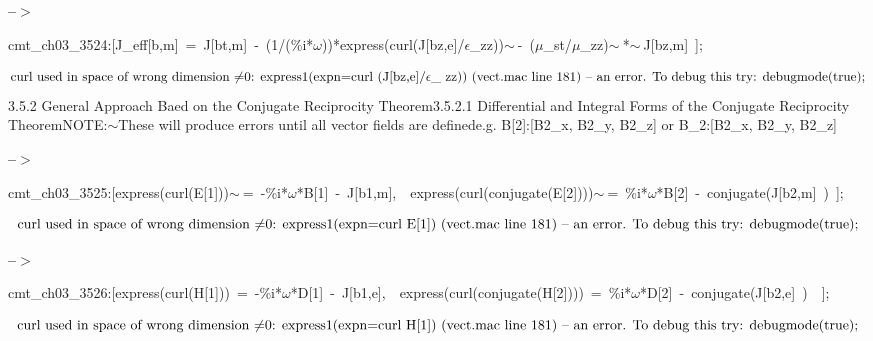 \documentclass[fleqn]{article}
\begin{document}
\noindent
\begin{minipage}[t]{4.000000em}\color{red}\bfseries
 --\ensuremath{\ensuremath{>}}	
\end{minipage}
\begin{minipage}[t]{\textwidth}\color{blue}
cmt\_ch03\_3524:[J\_eff[b,m]\ =\ J[bt,m]\ -\ (1/(\%i*\ensuremath{\omega}))*express(curl(J[bz,e]/\ensuremath{\epsilon}\_zz))\ensuremath{\sim\ }-\ (\ensuremath{\mu}\_st/\ensuremath{\mu}\_zz)\ensuremath{\sim\ }*\ensuremath{\sim\ }J[bz,m]\ ];
\end{minipage}
\[\displaystyle \mbox{%
curl used in space of wrong dimension
}\mbox{%
\ensuremath{\neq}0: express1(expn=curl (J[bz,e]/\ensuremath{\epsilon}\_ zz)) (vect.mac line 181)
}\mbox{%
 -- an error. To debug this try: debugmode(true);}\mbox{}
\]
3.5.2 General Approach Baed on the Conjugate Reciprocity Theorem3.5.2.1 Differential and Integral Forms of the Conjugate Reciprocity TheoremNOTE:\ensuremath{\sim }These will produce errors until all vector fields are definede.g. B[2]:[B2\_x, B2\_y, B2\_z] or B\_2:[B2\_x, B2\_y, B2\_z]


\noindent
\begin{minipage}[t]{4.000000em}\color{red}\bfseries
 --\ensuremath{\ensuremath{>}}	
\end{minipage}
\begin{minipage}[t]{\textwidth}\color{blue}
cmt\_ch03\_3525:[express(curl(E[1]))\ensuremath{\sim\ }=\ -\%i*\ensuremath{\omega}*B[1]\ -\ J[b1,m],\ \ express(curl(conjugate(E[2])))\ensuremath{\sim\ }=\ \%i*\ensuremath{\omega}*B[2]\ -\ conjugate(J[b2,m]\ )\ ];
\end{minipage}
\[\displaystyle \mbox{%
curl used in space of wrong dimension
}\mbox{%
\ensuremath{\neq}0: express1(expn=curl E[1]) (vect.mac line 181)
}\mbox{%
 -- an error. To debug this try: debugmode(true);}\mbox{}
\]


\noindent
\begin{minipage}[t]{4.000000em}\color{red}\bfseries
 --\ensuremath{\ensuremath{>}}	
\end{minipage}
\begin{minipage}[t]{\textwidth}\color{blue}
cmt\_ch03\_3526:[express(curl(H[1]))\ =\ -\%i*\ensuremath{\omega}*D[1]\ -\ J[b1,e],\ \ express(curl(conjugate(H[2])))\ =\ \%i*\ensuremath{\omega}*D[2]\ -\ conjugate(J[b2,e]\ )\ \ ];
\end{minipage}
\[\displaystyle \mbox{%
curl used in space of wrong dimension
}\mbox{%
\ensuremath{\neq}0: express1(expn=curl H[1]) (vect.mac line 181)
}\mbox{%
 -- an error. To debug this try: debugmode(true);}\mbox{}
\]
\end{document}
